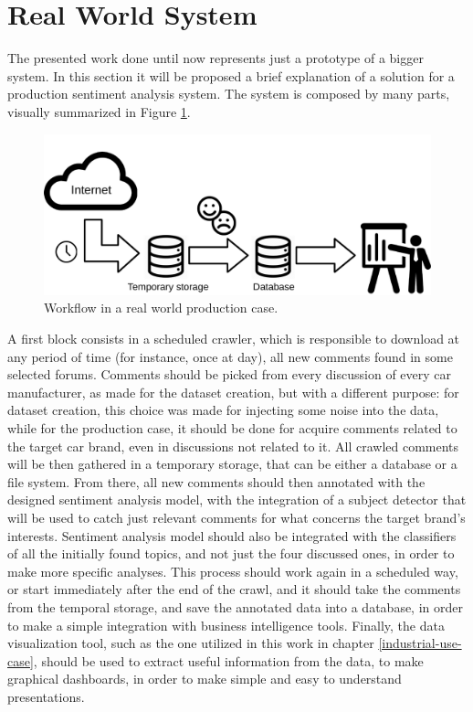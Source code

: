 \section{Real World System}

The presented work done until now represents just a prototype of a bigger system. In this section it will be proposed a brief explanation of a solution for a production sentiment analysis system. The system is composed by many parts, visually summarized in Figure \ref{fig:real-world-tool}.

\begin{figure}[H]
	\centering
	\includegraphics[width=\textwidth]{figures/real-world-tool.pdf}
	\caption{Workflow in a real world production case.}
	\label{fig:real-world-tool}
\end{figure}

A first block consists in a scheduled crawler, which is responsible to download at any period of time (for instance, once at day), all new comments found in some selected forums. Comments should be picked from every discussion of every car manufacturer, as made for the dataset creation, but with a different purpose: for dataset creation, this choice was made for injecting some noise into the data, while for the production case, it should be done for acquire comments related to the target car brand, even in discussions not related to it. All crawled comments will be then gathered in a temporary storage, that can be either a database or a file system. From there, all new comments should then annotated with the designed sentiment analysis model, with the integration of a subject detector that will be used to catch just relevant comments for what concerns the target brand's interests. Sentiment analysis model should also be integrated with the classifiers of all the initially found topics, and not just the four discussed ones, in order to make more specific analyses. This process should work again in a scheduled way, or start immediately after the end of the crawl, and it should take the comments from the temporal storage, and save the annotated data into a database, in order to make a simple integration with business intelligence tools. Finally, the data visualization tool, such as the one utilized in this work in chapter \ref{industrial-use-case}, should be used to extract useful information from the data, to make graphical dashboards, in order to make simple and easy to understand presentations.

